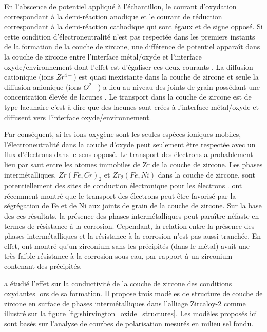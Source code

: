 \begin{refsection}
    En l'abscence de potentiel appliqué à l'échantillon, le courant d'oxydation correspondant à la demi-réaction anodique et le courant de réduction
    correspondant à la demi-réaction cathodique qui sont égaux et de signe opposé. Si cette condition d'électroneutralité n'est pas
    respectée dans les premiers instants de la formation de la couche de zircone, une différence de potentiel apparaît dans
    la couche de zircone entre l'interface métal/oxyde et l'interface oxyde/environnement dont l'effet est d'égaliser ces
    deux courants \citep{Cox1969}. La diffusion cationique (ions $Zr^{4+}$) est quasi inexistante dans la couche de
    zircone et seule
    la diffusion anionique (ions $O^{2-}$) a lieu au niveau des joints de grain possédant une concentration élevée de
    lacunes \citep{Cox1968-1,Brossmann1999}. Le transport dans la couche de zircone est de type lacunaire c'est-à-dire que des
    lacunes sont crées à l'interface métal/oxyde et diffusent vers l'interface oxyde/environnement. 

    Par conséquent, si les ions oxygène sont les seules espèces ioniques mobiles, l'électroneutralité dans la couche
    d'oxyde peut seulement être respectée avec un flux d'électrons dans le sens opposé. Le transport des électrons a
    probablement lieu par saut entre les atomes immobiles de Zr de la couche de zircone. Les phases intermétalliques,
    $Zr(Fe,Cr)_2$ et $Zr_2(Fe,Ni)$ dans la couche de zircone, sont potentiellement des sites de conduction électronique pour les électrons
    \citep{IAEA1998}.
    \citet{Sundell2012} ont récemment montré que le transport des électrons peut être favorisé par la ségrégation de Fe et
    de Ni aux joints de grain de la couche de zircone. Sur la base des ces résultats, la présence des phases intermétalliques peut
    paraître néfaste en termes de résistance à la corrosion. Cependant, la relation entre la présence des phases
    intermétalliques et la résistance à la corrosion n'est pas aussi tranchée. En effet, \citet{Barberis2005} ont 
    montré qu'un zirconium sans les précipités (dans le métal) avait une très faible résistance à la corrosion sous eau, par rapport à
    un zirconium contenant des précipités.  
     

    \citet{Shirvington1970-1} a étudié l'effet sur la conductivité de la couche de zircone des conditions
    oxydantes lors de sa formation. Il propose trois modèles de structure de couche de zircone en surface de phases intermétalliques dans
    l'alliage Zircaloy-2 comme illustré sur la figure \ref{fig:shirvington_oxide_structures}. Les modèles proposés ici sont
    basés sur l'analyse de courbes de polarisation mesurés en milieu sel fondu.


\end{refsection}
